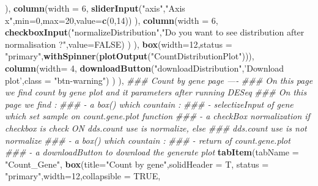 \documentclass[
  12pt,
]{article}
\newenvironment{Shaded}{\begin{snugshade}}{\end{snugshade}}
\newcommand{\CommentTok}[1]{\textcolor[rgb]{0.56,0.35,0.01}{\textit{#1}}}
\newcommand{\DataTypeTok}[1]{\textcolor[rgb]{0.13,0.29,0.53}{#1}}
\newcommand{\DecValTok}[1]{\textcolor[rgb]{0.00,0.00,0.81}{#1}}
\newcommand{\KeywordTok}[1]{\textcolor[rgb]{0.13,0.29,0.53}{\textbf{#1}}}
\newcommand{\NormalTok}[1]{#1}
\newcommand{\OtherTok}[1]{\textcolor[rgb]{0.56,0.35,0.01}{#1}}
\newcommand{\StringTok}[1]{\textcolor[rgb]{0.31,0.60,0.02}{#1}}
\begin{document}
\begin{Shaded}
\begin{Highlighting}[]
\NormalTok{                        ),}
                        \KeywordTok{column}\NormalTok{(}\DataTypeTok{width =} \DecValTok{6}\NormalTok{,}
                               \KeywordTok{sliderInput}\NormalTok{(}\StringTok{"axis"}\NormalTok{,}\StringTok{"Axis x"}\NormalTok{,}\DataTypeTok{min=}\DecValTok{0}\NormalTok{,}\DataTypeTok{max=}\DecValTok{20}\NormalTok{,}\DataTypeTok{value=}\KeywordTok{c}\NormalTok{(}\DecValTok{0}\NormalTok{,}\DecValTok{14}\NormalTok{))}
\NormalTok{                        ),}
                        \KeywordTok{column}\NormalTok{(}\DataTypeTok{width =} \DecValTok{6}\NormalTok{, }\KeywordTok{checkboxInput}\NormalTok{(}\StringTok{"normalizeDistribution"}\NormalTok{,}\StringTok{"Do you want to see distribution }
\StringTok{                                                        after normalisation ?"}\NormalTok{,}\DataTypeTok{value=}\OtherTok{FALSE}\NormalTok{)}
\NormalTok{                        )}
\NormalTok{                    ),}
                    \KeywordTok{box}\NormalTok{(}\DataTypeTok{width=}\DecValTok{12}\NormalTok{,}\DataTypeTok{status =} \StringTok{"primary"}\NormalTok{,}\KeywordTok{withSpinner}\NormalTok{(}\KeywordTok{plotOutput}\NormalTok{(}\StringTok{"CountDistributionPlot"}\NormalTok{))),}
                    \KeywordTok{column}\NormalTok{(}\DataTypeTok{width=} \DecValTok{4}\NormalTok{,}
                           \KeywordTok{downloadButton}\NormalTok{(}\StringTok{"downloadDistribution"}\NormalTok{,}\StringTok{'Download plot'}\NormalTok{,}\DataTypeTok{class =} \StringTok{"btn-warning"}\NormalTok{)}
\NormalTok{                    )}
\NormalTok{            ),}
            \CommentTok{### Count by gene page ----}
            \CommentTok{### On this page we find count by gene plot and it parameters after running DESeq}
            \CommentTok{### On this page we find :}
            \CommentTok{###     - a box() which countain :}
            \CommentTok{###         - selectizeInput of gene which set sample on count.gene.plot function}
            \CommentTok{###         - a checkBox normalization if checkbox is check ON dds.count use is normalize, else }
            \CommentTok{###           dds.count use is not normalize}
            \CommentTok{###     - a box() which countain :}
            \CommentTok{###         - return of count.gene.plot }
            \CommentTok{###     - a downloadButton to download  the generate plot}
            \KeywordTok{tabItem}\NormalTok{(}\DataTypeTok{tabName =} \StringTok{"Count_Gene"}\NormalTok{,}
                    \KeywordTok{box}\NormalTok{(}\DataTypeTok{title=}\StringTok{"Count by gene"}\NormalTok{,}\DataTypeTok{solidHeader =}\NormalTok{ T, }\DataTypeTok{status =} \StringTok{"primary"}\NormalTok{,}\DataTypeTok{width=}\DecValTok{12}\NormalTok{,}\DataTypeTok{collapsible =} \OtherTok{TRUE}\NormalTok{,}

\end{Highlighting}
\end{Shaded}
\end{document}

